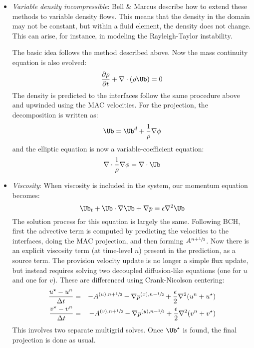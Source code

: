 \begin{itemize}

\item {\em Variable density incompressible}: Bell \& Marcus
  \cite{BellMarcus} describe how to extend these methods to variable
  density flows.  This means that the density in the domain may not be
  constant, but within a fluid element, the density does not change.
  This can arise, for instance, in modeling the Rayleigh-Taylor
  instability.

  The basic idea follows the method described above.  Now the
  mass continuity equation is also evolved:
  \begin{equation}
  \frac{\partial \rho}{\partial t} + \nabla \cdot (\rho \Ub) = 0
  \end{equation}
  The density is predicted to the interfaces follow the same procedure
  above and upwinded using the MAC velocities.
  For the projection, the decomposition is written as:
  \begin{equation}
  \Ub = \Ub^d + \frac{1}{\rho}\nabla \phi
  \end{equation}
  and the elliptic equation is now a variable-coefficient equation:
  \begin{equation}
  \nabla \cdot \frac{1}{\rho} \nabla \phi = \nabla \cdot \Ub
  \end{equation}

\item {\em Viscosity}: When viscosity is included in the system, our
  momentum equation becomes:
  \begin{equation}
  \Ub_t + \Ub\cdot \nabla \Ub + \nabla p = \epsilon \nabla^2 \Ub
  \end{equation}
  The solution process for this equation is largely the same.
  Following BCH, first the advective term is computed by predicting
  the velocities to the interfaces, doing the MAC projection, and then
  forming $A^{n+{\sfrac{1}{2}}}$.  Now there is an explicit viscosity term (at
  time-level $n$) present in the prediction, as a source term.  The
  provision velocity update is no longer a simple flux update, but
  instead requires solving two decoupled diffusion-like equations (one
  for $u$ and one for $v$).  These are differenced using
  Crank-Nicolson centering:
  \begin{eqnarray}
  \frac{u^\star - u^n}{\Delta t} &=& - A^{(u),n+{\sfrac{1}{2}}} - \nabla p^{(x),n-{\sfrac{1}{2}}}
       + \frac{\epsilon }{2} \nabla^2 (u^n + u^\star) \\
  \frac{v^\star - v^n}{\Delta t} &=& - A^{(v),n+{\sfrac{1}{2}}} - \nabla p^{(y),n-{\sfrac{1}{2}}}
       + \frac{\epsilon }{2} \nabla^2 (v^n + v^\star)
  \end{eqnarray}
  This involves two separate multigrid solves.  Once $\Ub^\star$ is found,
  the final projection is done as usual.


\end{itemize}
